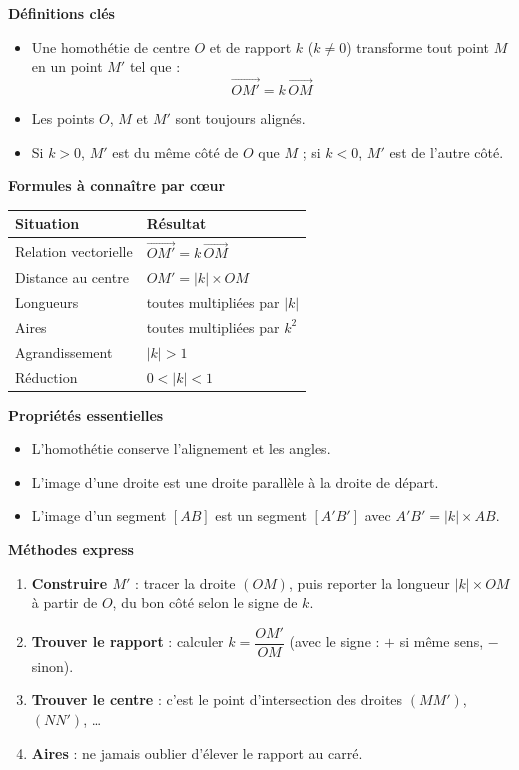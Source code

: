 \documentclass[11pt]{article}
\newcommand{\cle}[1]{{\popxbold\color{popdark}#1}}
\begin{document}
\begin{bilan}
\textbf{Définitions clés}
\begin{itemize}
\item Une \cle{homothétie} de \cle{centre} $O$ et de \cle{rapport} $k$ ($k\neq 0$) transforme tout point $M$ en un point $M'$ tel que :
\[\overrightarrow{OM'} = k\,\overrightarrow{OM}\]
\item Les points $O$, $M$ et $M'$ sont toujours \cle{alignés}.
\item Si $k>0$, $M'$ est du même côté de $O$ que $M$ ; si $k<0$, $M'$ est de l'autre côté.
\end{itemize}

\textbf{Formules à connaître par cœur}
\begin{center}
\begin{tabularx}{\linewidth}{|l|X|}\hline
\rowcolor{popblueL} \textbf{Situation} & \textbf{Résultat} \\ \hline
Relation vectorielle & $\overrightarrow{OM'} = k\,\overrightarrow{OM}$ \\ \hline
Distance au centre & $OM' = |k|\times OM$ \\ \hline
Longueurs & toutes multipliées par $|k|$ \\ \hline
Aires & toutes multipliées par $k^2$ \\ \hline
Agrandissement & $|k|>1$ \\ \hline
Réduction & $0<|k|<1$ \\ \hline
\end{tabularx}
\end{center}

\textbf{Propriétés essentielles}
\begin{itemize}
\item L'homothétie conserve l'\cle{alignement} et les \cle{angles}.
\item L'image d'une droite est une droite \cle{parallèle} à la droite de départ.
\item L'image d'un segment $[AB]$ est un segment $[A'B']$ avec $A'B' = |k|\times AB$.
\end{itemize}

\textbf{Méthodes express}
\begin{enumerate}
\item \textbf{Construire $M'$} : tracer la droite $(OM)$, puis reporter la longueur $|k|\times OM$ à partir de $O$, du bon côté selon le signe de $k$.
\item \textbf{Trouver le rapport} : calculer $k = \dfrac{OM'}{OM}$ (avec le signe : $+$ si même sens, $-$ sinon).
\item \textbf{Trouver le centre} : c'est le point d'intersection des droites $(MM')$, $(NN')$, \dots
\item \textbf{Aires} : ne jamais oublier d'élever le rapport au carré.
\end{enumerate}
\end{bilan}
\end{document}
